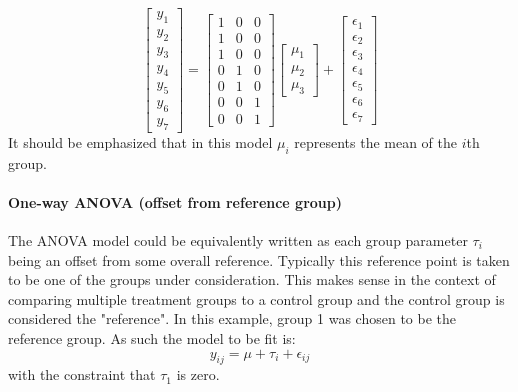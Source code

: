 \begin{equation}
  \begin{bmatrix}y_1 \\ y_2 \\ y_3 \\ y_4 \\ y_5 \\ y_6 \\ y_7 \end{bmatrix} =
  \begin{bmatrix}1 & 0 & 0 \\1 &0  &0 \\ 1 & 0 & 0 \\  0 & 1 & 0 \\  0 & 1 & 0 \\  0 & 0 & 1 \\  0 & 0 & 1\end{bmatrix}
  \begin{bmatrix}\mu_1 \\ \mu_2 \\ \mu_3  \end{bmatrix}
  +
  \begin{bmatrix} \epsilon_1 \\ \epsilon_2 \\ \epsilon_3 \\ \epsilon_4 \\ \epsilon_5 \\ \epsilon_6 \\ \epsilon_7 \end{bmatrix}
\end{equation}
It should be emphasized that in this model $\mu_i$ represents the mean of the $i$th group.

\paragraph{One-way ANOVA (offset from reference group)}
The ANOVA model could be equivalently written as each group parameter $\tau_i$ being an offset from some overall reference.  Typically this reference point is taken to be one of the groups under consideration. This makes sense in the context of comparing multiple treatment groups to a control group and the control group is considered the "reference". In this example, group 1 was chosen to be the reference group. As such the model to be fit is:
\begin{equation}
  y_{ij} = \mu + \tau_i + \epsilon_{ij}
\end{equation}
with the constraint that $\tau_1$ is zero.

